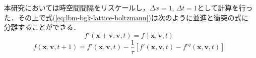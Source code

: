 本研究においては時空間間隔をリスケールし，$\Delta x = 1$, $\Delta t = 1$として計算を行った．その上で式(\ref{eq:lbm-bgk-lattice-boltzmann})は次のように並進と衝突の式に分離することができる．
\begin{equation}
  f'(\bm{x}+\bm{v}, \bm{v}, t)
  = f(\bm{x}, \bm{v}, t)
  \label{eq:lbm-streaming}
\end{equation}
\begin{equation}
  f(\bm{x}, \bm{v}, t+1)
  = f'(\bm{x}, \bm{v}, t) - \frac{1}{\tau} \left[ f'(\bm{x}, \bm{v}, t) - f^{eq}(\bm{x}, \bm{v}, t) \right]
  \label{eq:lbm-collision}
\end{equation}


